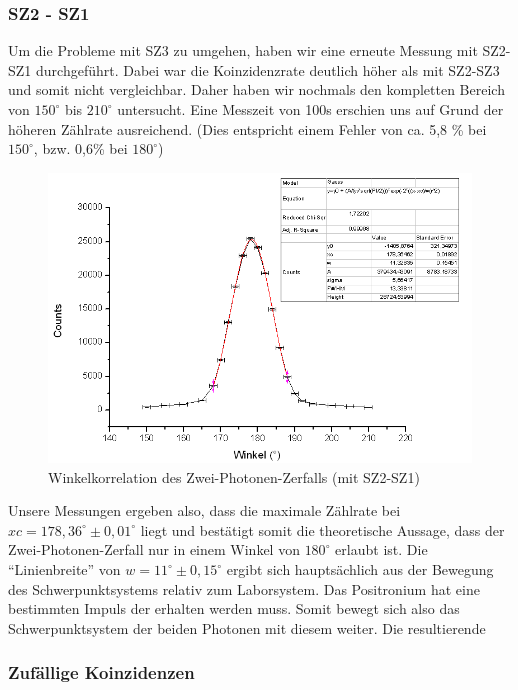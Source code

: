 
\subsubsection{SZ2 - SZ1}

Um die Probleme mit SZ3 zu umgehen, haben wir eine erneute Messung mit SZ2-SZ1 durchgeführt. Dabei war die Koinzidenzrate deutlich höher als mit SZ2-SZ3 und somit nicht vergleichbar. Daher haben wir nochmals den kompletten Bereich von $150^\circ$ bis $210^\circ$ untersucht. Eine Messzeit von 100s erschien uns auf Grund der höheren Zählrate ausreichend. (Dies entspricht einem Fehler von ca. 5,8 \% bei $150^\circ$, bzw. 0,6\% bei $180^\circ$)

\begin{figure}
 \includegraphics[width=\textwidth]{Graphen/180K.png}
 \caption{Winkelkorrelation des Zwei-Photonen-Zerfalls (mit SZ2-SZ1)}
\end{figure}

Unsere Messungen ergeben also, dass die maximale Zählrate bei $xc = 178,36^\circ \pm 0,01^\circ$ liegt und bestätigt somit die theoretische Aussage, dass der Zwei-Photonen-Zerfall nur in einem Winkel von $180^\circ$ erlaubt ist. Die "`Linienbreite"' von $w = 11^\circ \pm 0,15^\circ$ ergibt sich hauptsächlich aus der Bewegung des Schwerpunktsystems relativ zum Laborsystem. Das Positronium hat eine bestimmten Impuls der erhalten werden muss. Somit bewegt sich also das Schwerpunktsystem der beiden Photonen mit diesem weiter. Die resultierende %

\subsubsection{Zufällige Koinzidenzen}

